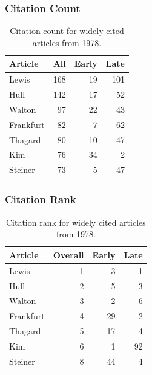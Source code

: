 \documentclass[
  10pt,
  letterpaper,
  DIV=11,
  numbers=noendperiod,
  twoside]{scrartcl}
\begin{document}
\subsubsection*{Citation Count}\label{sec-count-1978}

\begin{longtable}[]{@{}lrrr@{}}

\caption{\label{tbl-citation-count-1978}Citation count for widely cited
articles from 1978.}

\tabularnewline

\toprule\noalign{}
Article & All & Early & Late \\
\midrule\noalign{}
\endhead
\bottomrule\noalign{}
\endlastfoot
Lewis & 168 & 19 & 101 \\
Hull & 142 & 17 & 52 \\
Walton & 97 & 22 & 43 \\
Frankfurt & 82 & 7 & 62 \\
Thagard & 80 & 10 & 47 \\
Kim & 76 & 34 & 2 \\
Steiner & 73 & 5 & 47 \\

\end{longtable}

\subsubsection*{Citation Rank}\label{sec-rank-1978}

\begin{longtable}[]{@{}lrrr@{}}

\caption{\label{tbl-citation-rank-1978}Citation rank for widely cited
articles from 1978.}

\tabularnewline

\toprule\noalign{}
Article & Overall & Early & Late \\
\midrule\noalign{}
\endhead
\bottomrule\noalign{}
\endlastfoot
Lewis & 1 & 3 & 1 \\
Hull & 2 & 5 & 3 \\
Walton & 3 & 2 & 6 \\
Frankfurt & 4 & 29 & 2 \\
Thagard & 5 & 17 & 4 \\
Kim & 6 & 1 & 92 \\
Steiner & 8 & 44 & 4 \\

\end{longtable}
\end{document}

